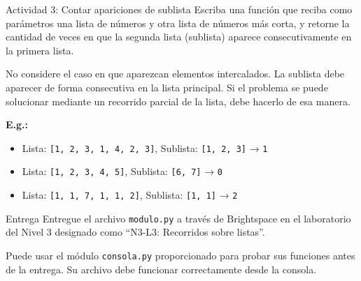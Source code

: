 \documentclass{ip-lab}
\begin{document}
\begin{sectionbox}{Actividad 3: Contar apariciones de sublista}
  Escriba una función que reciba como parámetros una lista de números y otra lista de números más corta, y retorne la cantidad de veces en que la segunda lista (sublista) aparece consecutivamente en la primera lista.

  No considere el caso en que aparezcan elementos intercalados. La sublista debe aparecer de forma consecutiva en la lista principal. Si el problema se puede solucionar mediante un recorrido parcial de la lista, debe hacerlo de esa manera.

  \pagebreak
  
  \textbf{E.g.:}
  \begin{itemize}
      \item Lista: \texttt{[1, 2, 3, 1, 4, 2, 3]}, Sublista: \texttt{[1, 2, 3]} → \texttt{1}
      \item Lista: \texttt{[1, 2, 3, 4, 5]}, Sublista: \texttt{[6, 7]} → \texttt{0}
      \item Lista: \texttt{[1, 1, 7, 1, 1, 2]}, Sublista: \texttt{[1, 1]} → \texttt{2}
  \end{itemize}
\end{sectionbox}

\begin{sectionbox}{Entrega}
Entregue el archivo \texttt{modulo.py} a través de Brightspace en el laboratorio del Nivel 3 designado como ``N3-L3: Recorridos sobre listas''.

Puede usar el módulo \texttt{consola.py} proporcionado para probar sus funciones antes de la entrega. Su archivo debe funcionar correctamente desde la consola.
\end{sectionbox}
\end{document}
